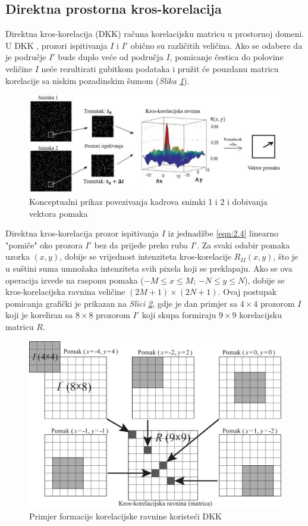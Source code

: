 \subsection{Direktna prostorna kros-korelacija}
Direktna kros-korelacija (DKK) računa korelacijsku matricu u prostornoj domeni. U DKK , prozori ispitivanja $I$ i $I'$ obično su različitih veličina. Ako se odabere da je područje $I'$ bude duplo veće od područja $I$, pomicanje čestica do polovine veličine $I$ neće rezultirati gubitkom podataka i pružit će pouzdanu matricu korelacije sa niskim pozadinskim šumom (\textit{Slika \ref{sl:2.8}}).
\begin{figure}[h]  
	\centering
	\includegraphics[width=14cm]{./2_DPIV/2_8KrosKorelacijskaRavnina.jpg} 
	\caption{Konceptualni prikaz povezivanja kadrova snimki 1 i 2 i dobivanja vektora pomaka\cite{brossard2009_article}}
	\label{sl:2.8}
\end{figure}
\par
Direktna kros-korelacija prozor ispitivanja $I$ iz jednadžbe \ref{eqn:2.4} linearno "pomiče" oko prozora $I'$ bez da prijeđe preko ruba $I'$. Za svaki odabir pomaka uzorka $(x, y)$, dobije se vrijednost intenziteta kros-korelacije $R_{II}(x, y)$, što je u suštini suma umnožaka intenziteta svih pixela koji se preklapaju. Ako se ova operacija izvede na rasponu pomaka ($-M \leq x \leq M$; $-N \leq y \leq N$), dobije se kros-korelacijska ravnina veličine $(2M+1) \times (2N+1)$. Ovaj postupak pomicanja grafički je prikazan na \textit{Slici \ref{sl:2.9}}, gdje je dan primjer sa $4 \times 4$ prozorom $I$ koji je koreliran sa $8 \times 8$ prozorom $I'$ koji skupa formiraju $9 \times 9$ korelacijsku matricu $R$. 
\begin{figure}[h]  
	\centering
	\includegraphics[width=16cm]{./2_DPIV/2_9PostupakPomicanja.pdf} 
	\caption{Primjer formacije korelacijske ravnine koristeći DKK}
	\label{sl:2.9}
\end{figure}
